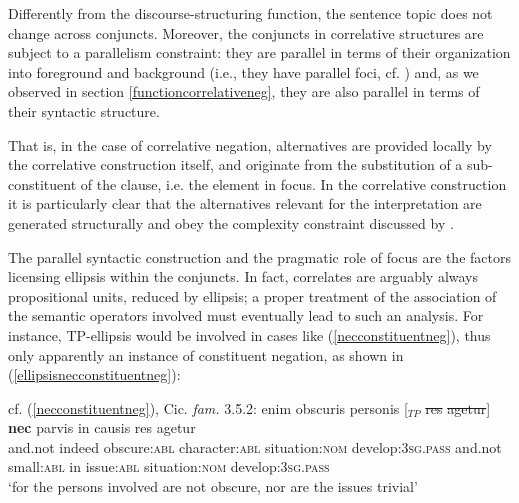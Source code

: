 \documentclass[output=paper,modfonts,nonflat,citecolor=brown,
showindex
]{langsci/langscibook}
\begin{document}
\vspace{0.5em}

\noindent Differently from the discourse-structuring function, the sentence topic does not change across conjuncts. Moreover, the conjuncts in correlative structures are subject to a parallelism constraint: they are parallel in terms of their organization into foreground and background (i.e., they have parallel foci, cf. \citealt[64]{Koenig91}) and, as we observed in section \ref{functioncorrelativeneg}, they are also parallel in terms of their syntactic structure.

That is, in the case of correlative negation, alternatives are provided locally by the correlative construction itself, and originate from the substitution of a sub-constituent of the clause, i.e. the element in focus. In the correlative construction it is particularly clear that the alternatives relevant for the interpretation are generated structurally and obey the complexity constraint discussed by \citet{Katzir07, FoxKatzir11}.

The parallel syntactic construction and the pragmatic role of focus are the factors licensing ellipsis within the conjuncts. In fact, correlates are arguably always propositional units, reduced by ellipsis; a proper treatment of the association of the semantic operators involved must eventually lead to such an analysis. For instance, TP-ellipsis would be involved in cases like (\ref{necconstituentneg}), thus only apparently an instance of constituent negation, as shown in (\ref{ellipsisnecconstituentneg}):

{\begin{exe}
\ex \label{ellipsisnecconstituentneg} cf. (\ref{necconstituentneg}), Cic. {\emph{fam.}} 3.5.2:
 enim obscuris personis [$_{TP}$ \sout{res} \sout{agetur}] {\textbf{nec}} parvis in causis res agetur\\
and.not indeed obscure:{\textsc{abl}} character:{\textsc{abl}} {} situation:{\textsc{nom}} develop:{\textsc{3sg.pass}} and.not small:{\textsc{abl}} in issue:{\textsc{abl}} situation:{\textsc{nom}} develop:{\textsc{3sg.pass}}\\

`for the persons involved are not obscure, nor are the issues trivial'
\end{exe}}
\end{document}
